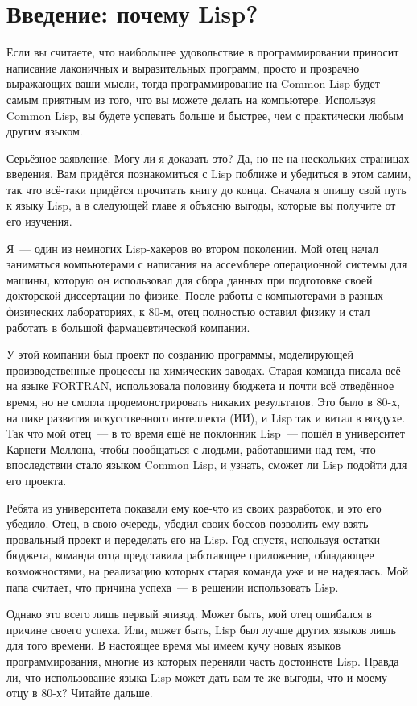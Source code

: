 \chapter{Введение: почему Lisp?}
\label{ch:01}

Если вы считаете, что наибольшее удовольствие в программировании приносит написание
лаконичных и выразительных программ, просто и прозрачно выражающих ваши мысли, тогда
программирование на Common Lisp будет самым приятным из того, что вы можете делать на
компьютере. Используя Common Lisp, вы будете успевать больше и быстрее, чем с
практически любым другим языком.

Серьёзное заявление. Могу ли я доказать это? Да, но не на нескольких страницах
введения. Вам придётся познакомиться с Lisp поближе и убедиться в этом самим, так что
всё-таки придётся прочитать книгу до конца. Сначала я опишу свой путь к языку Lisp, а в
следующей главе я объясню выгоды, которые вы получите от его изучения.

Я~--- один из немногих Lisp-хакеров во втором поколении. Мой отец начал заниматься
компьютерами с написания на ассемблере операционной системы для машины, которую он
использовал для сбора данных при подготовке своей докторской диссертации по физике. После
работы с компьютерами в разных физических лабораториях, к 80-м, отец полностью оставил
физику и стал работать в большой фармацевтической компании.

У этой компании был проект по созданию программы, моделирующей производственные процессы
на химических заводах. Старая команда писала всё на языке FORTRAN, использовала половину бюджета и
почти всё отведённое время, но не смогла продемонстрировать никаких результатов. Это было в
80-х, на пике развития искусственного интеллекта (ИИ), и Lisp так и витал в воздухе. Так что
мой отец~--- в то время ещё не поклонник Lisp~--- пошёл в университет Карнеги-Меллона,
чтобы пообщаться с людьми, работавшими над тем, что впоследствии стало языком Common Lisp, и
узнать, сможет ли Lisp подойти для его проекта.

Ребята из университета показали ему кое-что из своих разработок, и это его убедило. Отец,
в свою очередь, убедил своих боссов позволить ему взять провальный проект и переделать его на
Lisp. Год спустя, используя остатки бюджета, команда отца представила работающее
приложение, обладающее возможностями, на реализацию которых старая команда уже и не
надеялась. Мой папа считает, что причина успеха~--- в решении использовать Lisp.

Однако это всего лишь первый эпизод. Может быть, мой отец ошибался в причине своего
успеха. Или, может быть, Lisp был лучше других языков лишь для того времени. В настоящее
время мы имеем кучу новых языков программирования, многие из которых переняли часть
достоинств Lisp. Правда ли, что использование языка Lisp может дать вам те же выгоды,
что и моему отцу в 80-х? Читайте дальше.

